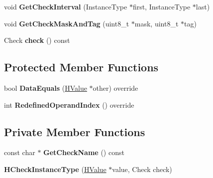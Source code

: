 \begin{DoxyCompactItemize}
\item 
void {\bfseries Get\+Check\+Interval} (Instance\+Type $\ast$first, Instance\+Type $\ast$last)\hypertarget{classv8_1_1internal_1_1_h_check_instance_type_ad44def29d18d69a40755c79d9abc1325}{}\label{classv8_1_1internal_1_1_h_check_instance_type_ad44def29d18d69a40755c79d9abc1325}

\item 
void {\bfseries Get\+Check\+Mask\+And\+Tag} (uint8\+\_\+t $\ast$mask, uint8\+\_\+t $\ast$tag)\hypertarget{classv8_1_1internal_1_1_h_check_instance_type_af153c2f6304c65abc572f2c041d06bce}{}\label{classv8_1_1internal_1_1_h_check_instance_type_af153c2f6304c65abc572f2c041d06bce}

\item 
Check {\bfseries check} () const \hypertarget{classv8_1_1internal_1_1_h_check_instance_type_a6229a4664623b7a8cf116ee3ed611591}{}\label{classv8_1_1internal_1_1_h_check_instance_type_a6229a4664623b7a8cf116ee3ed611591}

\end{DoxyCompactItemize}
\subsection*{Protected Member Functions}
\begin{DoxyCompactItemize}
\item 
bool {\bfseries Data\+Equals} (\hyperlink{classv8_1_1internal_1_1_h_value}{H\+Value} $\ast$other) override\hypertarget{classv8_1_1internal_1_1_h_check_instance_type_a741a0469ec560a9c27edccc71b6d2323}{}\label{classv8_1_1internal_1_1_h_check_instance_type_a741a0469ec560a9c27edccc71b6d2323}

\item 
int {\bfseries Redefined\+Operand\+Index} () override\hypertarget{classv8_1_1internal_1_1_h_check_instance_type_af2e0f61bd2184bc95567fb3c5b5bdd68}{}\label{classv8_1_1internal_1_1_h_check_instance_type_af2e0f61bd2184bc95567fb3c5b5bdd68}

\end{DoxyCompactItemize}
\subsection*{Private Member Functions}
\begin{DoxyCompactItemize}
\item 
const char $\ast$ {\bfseries Get\+Check\+Name} () const \hypertarget{classv8_1_1internal_1_1_h_check_instance_type_a995de74fc3f393b1bd083211dd5159fc}{}\label{classv8_1_1internal_1_1_h_check_instance_type_a995de74fc3f393b1bd083211dd5159fc}

\item 
{\bfseries H\+Check\+Instance\+Type} (\hyperlink{classv8_1_1internal_1_1_h_value}{H\+Value} $\ast$value, Check check)\hypertarget{classv8_1_1internal_1_1_h_check_instance_type_a247d8955aab49cdb6e0eef4c67081b49}{}\label{classv8_1_1internal_1_1_h_check_instance_type_a247d8955aab49cdb6e0eef4c67081b49}

\end{DoxyCompactItemize}
